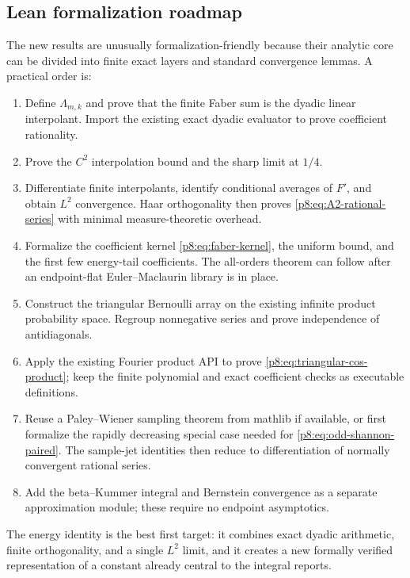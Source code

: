 \documentclass[11pt]{article}
\theoremstyle{definition}
\theoremstyle{remark}
\begin{document}
\subsection{Lean formalization roadmap}

The new results are unusually formalization-friendly because their analytic
core can be divided into finite exact layers and standard convergence lemmas.
A practical order is:

\begin{enumerate}
\item Define $\Lambda_{m,k}$ and prove that the finite Faber sum is the dyadic
      linear interpolant.  Import the existing exact dyadic evaluator to prove
      coefficient rationality.
\item Prove the $C^2$ interpolation bound and the sharp limit at $1/4$.
\item Differentiate finite interpolants, identify conditional averages of
      $F'$, and obtain $L^2$ convergence.  Haar orthogonality then proves
      \eqref{p8:eq:A2-rational-series} with minimal measure-theoretic overhead.
\item Formalize the coefficient kernel \eqref{p8:eq:faber-kernel}, the uniform
      bound, and the first few energy-tail coefficients.  The all-orders
      theorem can follow after an endpoint-flat Euler--Maclaurin library is in
      place.
\item Construct the triangular Bernoulli array on the existing infinite
      product probability space.  Regroup nonnegative series and prove
      independence of antidiagonals.
\item Apply the existing Fourier product API to prove
      \eqref{p8:eq:triangular-cos-product}; keep the finite polynomial and exact
      coefficient checks as executable definitions.
\item Reuse a Paley--Wiener sampling theorem from mathlib if available, or
      first formalize the rapidly decreasing special case needed for
      \eqref{p8:eq:odd-shannon-paired}.  The sample-jet identities then reduce to
      differentiation of normally convergent rational series.
\item Add the beta--Kummer integral and Bernstein convergence as a separate
      approximation module; these require no endpoint asymptotics.
\end{enumerate}

The energy identity is the best first target: it combines exact dyadic
arithmetic, finite orthogonality, and a single $L^2$ limit, and it creates a
new formally verified representation of a constant already central to the
integral reports.
\end{document}
